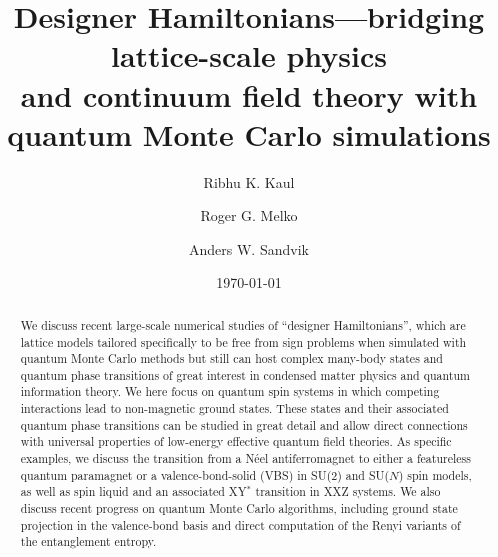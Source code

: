 \documentclass[aps,prb,groupedaddress, twocolumn]{revtex4}
\begin{document}


\title{Designer Hamiltonians---bridging lattice-scale physics \\ and continuum field theory with 
quantum Monte Carlo simulations} 

\author{Ribhu K. Kaul}
\author{Roger G. Melko}
\author{Anders W. Sandvik}

\date{\today}

\begin{abstract}
We discuss recent large-scale numerical studies of ``designer Hamiltonians'', which are lattice models tailored 
specifically to be free from sign problems when simulated with quantum Monte Carlo methods but still can host 
complex  many-body states and quantum phase transitions of great interest in condensed matter physics and quantum 
information theory. We here focus on quantum spin systems in which competing interactions lead to non-magnetic 
ground states. These states and their associated quantum phase transitions can be studied in great detail
and allow direct connections with universal properties of low-energy effective quantum field theories. As 
specific examples, we discuss the transition from a N\'eel antiferromagnet to either a featureless quantum 
paramagnet or a valence-bond-solid (VBS) in SU($2$) and SU($N$) spin models, as well as spin liquid and an
associated XY$^*$ transition in XXZ systems. We also discuss recent progress on quantum Monte Carlo algorithms, 
including ground state projection in the valence-bond basis and direct computation of the Renyi variants of 
the entanglement entropy.
\end{abstract}

\pacs{}

\maketitle
\end{document}
